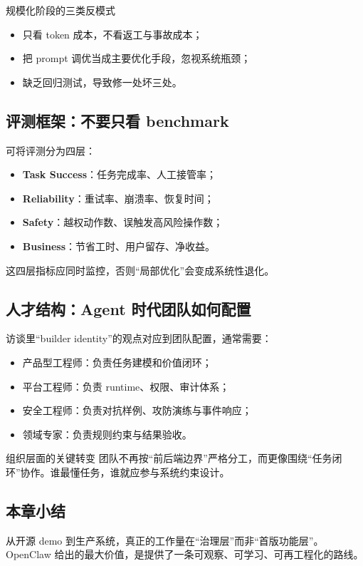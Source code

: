 \begin{warningbox}{规模化阶段的三类反模式}
\begin{itemize}
    \item 只看 token 成本，不看返工与事故成本；
    \item 把 prompt 调优当成主要优化手段，忽视系统瓶颈；
    \item 缺乏回归测试，导致修一处坏三处。
\end{itemize}
\end{warningbox}

\subsection{评测框架：不要只看 benchmark}

可将评测分为四层：
\begin{itemize}
    \item \textbf{Task Success}：任务完成率、人工接管率；
    \item \textbf{Reliability}：重试率、崩溃率、恢复时间；
    \item \textbf{Safety}：越权动作数、误触发高风险操作数；
    \item \textbf{Business}：节省工时、用户留存、净收益。
\end{itemize}

这四层指标应同时监控，否则“局部优化”会变成系统性退化。

\subsection{人才结构：Agent 时代团队如何配置}

访谈里“builder identity”的观点对应到团队配置，通常需要：
\begin{itemize}
    \item 产品型工程师：负责任务建模和价值闭环；
    \item 平台工程师：负责 runtime、权限、审计体系；
    \item 安全工程师：负责对抗样例、攻防演练与事件响应；
    \item 领域专家：负责规则约束与结果验收。
\end{itemize}

\begin{knowledgebox}{组织层面的关键转变}
团队不再按“前后端边界”严格分工，而更像围绕“任务闭环”协作。谁最懂任务，谁就应参与系统约束设计。
\end{knowledgebox}

\subsection{本章小结}
从开源 demo 到生产系统，真正的工作量在“治理层”而非“首版功能层”。OpenClaw 给出的最大价值，是提供了一条可观察、可学习、可再工程化的路线。

